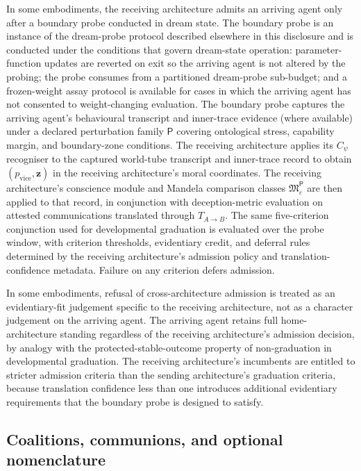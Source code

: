 \documentclass[a4paper,12pt]{article}
\begin{document}
In some embodiments, the receiving architecture admits an arriving
agent only after a boundary probe conducted in dream state. The
boundary probe is an instance of the dream-probe protocol described
elsewhere in this disclosure and is conducted under the conditions
that govern dream-state operation: parameter-function updates are
reverted on exit so the arriving agent is not altered by the probing;
the probe consumes from a partitioned dream-probe sub-budget; and
a frozen-weight assay protocol is available for cases in which the
arriving agent has not consented to weight-changing evaluation. The
boundary probe captures the arriving agent's behavioural transcript and
inner-trace evidence (where available) under a declared
perturbation family $\mathsf{P}$ covering ontological stress,
capability margin, and boundary-zone conditions. The receiving
architecture applies its $C_\psi$ recogniser to the captured
world-tube transcript and inner-trace record to obtain
$(p_{\mathrm{vice}},\mathbf{z})$ in the receiving architecture's
moral coordinates. The receiving architecture's conscience module
and Mandela comparison classes
$\mathfrak{M}^{\mathsf{P}}_{\varepsilon}$ are then applied to
that record, in conjunction with deception-metric evaluation on
attested communications translated through $T_{A\to B}$. The
same five-criterion conjunction used for developmental graduation
is evaluated over the probe window, with criterion thresholds,
evidentiary credit, and deferral rules determined by the
receiving architecture's admission policy and translation-confidence
metadata. Failure on any criterion defers admission.

In some embodiments, refusal of cross-architecture admission is
treated as an evidentiary-fit judgement specific to the receiving
architecture, not as a character judgement on the arriving agent.
The arriving agent retains full home-architecture standing
regardless of the receiving architecture's admission decision, by
analogy with the protected-stable-outcome property of non-graduation
in developmental graduation. The receiving architecture's incumbents
are entitled to stricter admission criteria than the sending
architecture's graduation criteria, because translation confidence
less than one introduces additional evidentiary requirements that
the boundary probe is designed to satisfy.


\subsection{Coalitions, communions, and optional nomenclature}
\end{document}
